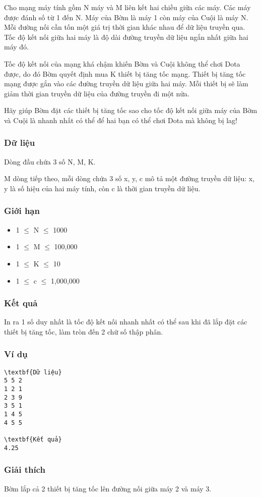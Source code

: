 



   Cho mạng máy tính gồm N máy và M liên kết hai chiều giữa các máy. Các máy được đánh số từ 1 đến N. Máy của Bờm là máy 1 còn máy của Cuội là máy N. Mỗi đường nối cần tốn một giá trị thời gian khác nhau để dữ liệu truyền qua. Tốc độ kết nối giữa hai máy là độ dài đường truyền dữ liệu ngắn nhất giữa hai máy đó.  

   Tốc độ kết nối của mạng khá chậm khiến Bờm và Cuội không thể chơi Dota được, do đó Bờm quyết định mua K thiết bị tăng tốc mạng. Thiết bị tăng tốc mạng được gắn vào các đường truyền dữ liệu giữa hai máy. Mỗi thiết bị sẽ làm giảm thời gian truyền dữ liệu của đường truyền đi một nửa.  

   Hãy giúp Bờm đặt các thiết bị tăng tốc sao cho tốc độ kết nối giữa máy của Bờm và Cuội là nhanh nhất có thể để hai bạn có thể chơi Dota mà không bị lag!  

\subsubsection{   Dữ liệu  }

   Dòng đầu chứa 3 số N, M, K.  

   M dòng tiếp theo, mỗi dòng chứa 3 số x, y, c mô tả một đường truyền dữ liệu: x, y là số hiệu của hai máy tính, còn c là thời gian truyền dữ liệu.  

\subsubsection{   Giới hạn  }
\begin{itemize}
	\item     1  $\le$  N  $\le$  1000   
	\item     1  $\le$  M  $\le$  100,000   
	\item     1  $\le$  K  $\le$  10   
	\item     1  $\le$  c  $\le$  1,000,000   
\end{itemize}

\subsubsection{   Kết quả  }

   In ra 1 số duy nhất là tốc độ kết nối nhanh nhất có thể sau khi đã lắp đặt các thiết bị tăng tốc, làm tròn đến 2 chữ số thập phân.  

\subsubsection{   Ví dụ  }
\begin{verbatim}
\textbf{Dữ liệu}
5 5 2
1 2 1
2 3 9
3 5 1
1 4 5
4 5 5

\textbf{Kết quả}
4.25
\end{verbatim}

\subsubsection{   Giải thích  }

   Bờm lắp cả 2 thiết bị tăng tốc lên đường nối giữa máy 2 và máy 3.  
